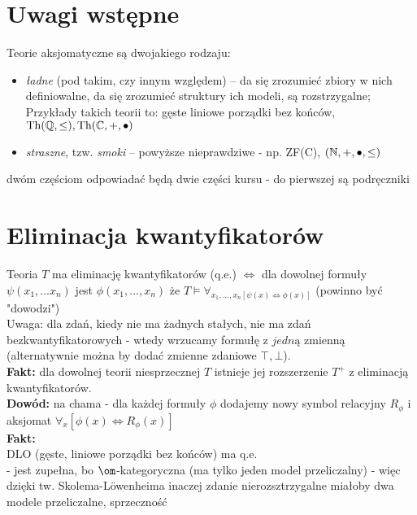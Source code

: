 \documentclass{article}
\begin{document}
\section*{Uwagi wstępne}
Teorie aksjomatyczne są dwojakiego rodzaju:
\begin{itemize}
	\item \textit{ładne} (pod takim, czy innym względem) -- da się zrozumieć zbiory w nich definiowalne, da się zrozumieć struktury ich modeli, są rozstrzygalne; Przykłady takich teorii to: gęste liniowe porządki bez końców,  $\text{Th}(\mathbb{Q}, \leq), \text{Th}(\mathbb{C},+, \bullet)$
	\item \textit{straszne}, tzw. \textit{smoki} -- powyższe nieprawdziwe - np. ZF(C), $(\mathbb{N}, +, \bullet, \leq)$\\
\end{itemize}
dwóm częściom odpowiadać będą dwie części kursu - do pierwszej są podręczniki












\section{Eliminacja kwantyfikatorów}
Teoria $T$ ma eliminację kwantyfikatorów (q.e.) $\iff$ dla dowolnej formuły $\psi(x_1,...x_n)$ jest $\phi(x_1,...,x_n)$ że $T\models \forall_{x_1,...,x_n[\psi(x)\iff\phi(x)]}$ (powinno być "dowodzi")\\

Uwaga: dla zdań, kiedy nie ma żadnych stałych, nie ma zdań bezkwantyfikatorowych - wtedy wrzucamy formułę z $jedną$ zmienną (alternatywnie można by dodać zmienne zdaniowe $\top, \bot$).\\

\textbf{Fakt:} dla dowolnej teorii niesprzecznej $T$ istnieje jej rozszerzenie $T^+$ z eliminacją kwantyfikatorów.\\

\textbf{Dowód:} na chama - dla każdej formuły $\phi$ dodajemy nowy symbol relacyjny $R_{\phi}$ i aksjomat $\forall_{x}[\phi(x)\iff R_{\phi}(x)]$\\


\textbf{Fakt:}\\
DLO (gęste, liniowe porządki bez końców) ma q.e.\\
- jest zupełna, bo $\om$-kategoryczna (ma tylko jeden model przeliczalny) - więc dzięki tw. Skolema-L{\"o}wenheima inaczej zdanie nierozsztrzygalne miałoby dwa modele przeliczalne, sprzeczność\\
\end{document}
